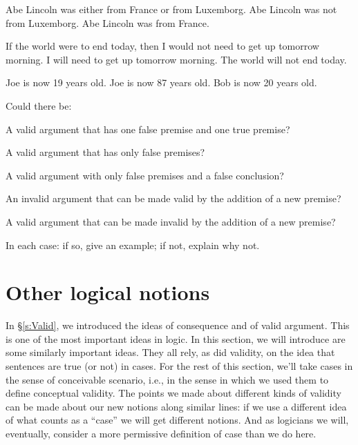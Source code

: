 \begin{earg}
\prem Abe Lincoln was either from France or from Luxemborg.
\prem Abe Lincoln was not from Luxemborg.
\conc Abe Lincoln was from France.
\end{earg}

\begin{earg}
\prem If the world were to end today, then I would not need to get up tomorrow morning.
\prem I will need to get up tomorrow morning.
\conc The world will not end today.
\end{earg}

\begin{earg}
\prem Joe is now 19 years old.
\prem Joe is now 87 years old.
\conc Bob is now 20 years old.
\end{earg}

\problempart
\label{pr.EnglishCombinations}
Could there be:
	\begin{earg}
		\item A valid argument that has one false premise and one true premise?
		\item A valid argument that has only false premises?
		\item A valid argument with only false premises and a false conclusion?
		\item An invalid argument that can be made valid by the addition of a new premise?
		\item A valid argument that can be made invalid by the addition of a new premise?
	\end{earg}
In each case: if so, give an example; if not, explain why not.

\medskip 

\todo{!!!}


\chapter{Other logical notions}\label{s:BasicNotions}

In \S\ref{s:Valid}, we introduced the ideas of consequence and of valid argument.  This is one of the most important ideas in logic. In this section, we will introduce are some similarly important ideas. They all rely, as did validity, on the idea that sentences are true (or not) in cases. For the rest of this section, we'll take cases in the sense of conceivable scenario, i.e., in the sense in which we used them to define conceptual validity. The points we made about different kinds of validity can be made about our new notions along similar lines: if we use a different idea of what counts as a ``case'' we will get different notions.  And as logicians we will, eventually, consider a more permissive definition of case than we do here.  

